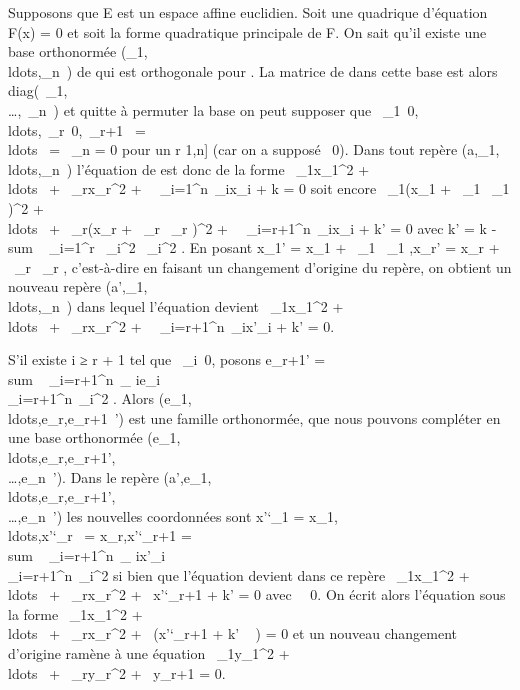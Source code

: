\documentclass[]{article}
\begin{document}
Supposons que E est un espace affine euclidien. Soit \Sigma une quadrique
d'équation F(x) = 0 et soit \Phi la forme quadratique principale de F. On
sait qu'il existe une base orthonormée
(\overrightarrowe\_1,\\ldots,\overrightarrowe\_n~)
de \vecE qui est orthogonale pour \Phi. La matrice de \Phi
dans cette base est alors
diag(\lambda~\_1,\\\ldots,\lambda~\_n~)
et quitte à permuter la base on peut supposer que
\lambda~\_1\neq~0,\\ldots,\lambda~\_r\mathrel\neq~0,\lambda~\_r+1~
= \\ldots~ =
\lambda~\_n = 0 pour un r \in {[}1,n{]} (car on a supposé
\Phi\neq~0). Dans tout repère
(a,\overrightarrowe\_1,\\ldots,\overrightarrowe\_n~)
l'équation de \Sigma est donc de la forme \lambda~\_1x\_1^2 +
\\ldots~ +
\lambda~\_rx\_r^2 +\
\sum ~
\_i=1^n\alpha~\_ix\_i + k = 0 soit encore
\lambda~\_1(x\_1 + \alpha~\_1 \lambda~\_1 )^2 +
\\ldots~ +
\lambda~\_r(x\_r + \alpha~\_r \over
2\lambda~\_r )^2 +\
\sum ~
\_i=r+1^n\alpha~\_ix\_i + k' = 0 avec k' = k
-\\sum ~
\_i=1^r \alpha~\_i^2 \lambda~\_i^2 . En posant x\_1' = x\_1 +
\alpha~\_1 \lambda~\_1 ,x\_r' =
x\_r + \alpha~\_r \over 2\lambda~\_r ,
c'est-à-dire en faisant un changement d'origine du repère, on obtient un
nouveau repère
(a',\overrightarrowe\_1,\\ldots,\overrightarrowe\_n~)
dans lequel l'équation devient \lambda~\_1x\_1^2 +
\\ldots~ +
\lambda~\_rx\_r^2 +\
\sum ~
\_i=r+1^n\alpha~\_ix'\_i + k' = 0.

S'il existe i ≥ r + 1 tel que \alpha~\_i\neq~0,
posons e\_r+1' =
\\sum ~
\_i=r+1^n\alpha~\_ ie\_i \over
\sqrt\\\sum
 \_i=r+1^n\alpha~\_i^2 . Alors
(e\_1,\\ldots,e\_r,e\_r+1~')
est une famille orthonormée, que nous pouvons compléter en une base
orthonormée
(e\_1,\\ldots,e\_r,e\_r+1',\\\ldots,e\_n~').
Dans le repère
(a',e\_1,\\ldots,e\_r,e\_r+1',\\\ldots,e\_n~')
les nouvelles coordonnées sont x'`\_1 =
x\_1,\\ldots,x'`\_r~
= x\_r,x'`\_r+1 =
\\sum ~
\_i=r+1^n\alpha~\_ ix'\_i \over
\sqrt\\\sum
 \_i=r+1^n\alpha~\_i^2 si bien que
l'équation devient dans ce repère \lambda~\_1x\_1^2 +
\\ldots~ +
\lambda~\_rx\_r^2 + \beta~x'`\_r+1 + k' = 0 avec
\beta~\neq~0. On écrit alors l'équation sous la forme
\lambda~\_1x\_1^2 +
\\ldots~ +
\lambda~\_rx\_r^2 + \beta~(x'`\_r+1 + k'
\over \beta~ ) = 0 et un nouveau changement d'origine ramène
à une équation \lambda~\_1y\_1^2 +
\\ldots~ +
\lambda~\_ry\_r^2 + \beta~y\_r+1 = 0.
\end{document}

